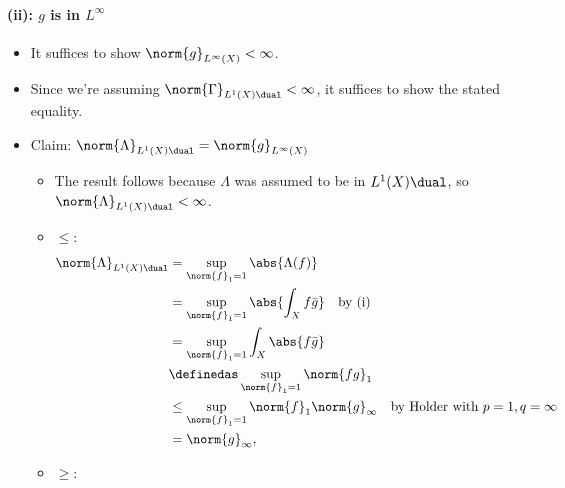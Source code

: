 \begin{solution}
\hypertarget{ii-g-is-in-linfty}{%
\paragraph{\texorpdfstring{(ii): \(g\) is in
\(L^\infty\)}{(ii): g is in L\^{}\textbackslash infty}}\label{ii-g-is-in-linfty}}

\begin{itemize}
\item
  It suffices to show \(\norm{g}_{L^\infty(X)} < \infty\).
\item
  Since we're assuming \(\norm{\Gamma}_{L^1(X)\dual} < \infty\), it
  suffices to show the stated equality.
\item
  Claim: \(\norm{\Lambda}_{L^1(X)\dual} =\norm{g}_{L^\infty(X)}\)

  \begin{itemize}
  \item
    The result follows because \(\Lambda\) was assumed to be in
    \(L^1(X)\dual\), so \(\norm{\Lambda}_{L^1(X)\dual} < \infty\).
  \item
    \(\leq\):
    \begin{align*}
    \norm{\Lambda}_{L^1(X)\dual} 
    &= \sup_{\norm{f}_1 = 1} \abs{\Lambda(f)} \\
    &= \sup_{\norm{f}_1 = 1} \abs{\int_X f \bar g} \quad\text{by (i)}\\
    &= \sup_{\norm{f}_1 = 1} \int_X \abs{f \bar g} \\
    &\definedas \sup_{\norm{f}_1 = 1} \norm{fg}_1 \\
    &\leq \sup_{\norm{f}_1 = 1} \norm{f}_1 \norm{g}_\infty \quad\text{by Holder with } p=1,q=\infty\\
    &= \norm{g}_\infty
    ,\end{align*}
  \item
    \(\geq\):


\end{itemize}
\end{itemize}
\end{solution}

